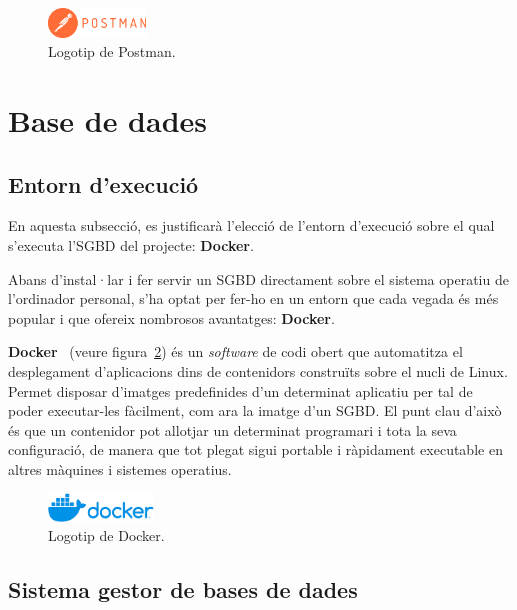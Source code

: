 \documentclass[a4paper,12pt]{ThesisStyle}
\begin{document}
\begin{figure}[H]
  \centering
  \includegraphics[width=0.23\textwidth]{assets/logos/Postman.png}
  \caption{\label{img:logo_postman}Logotip de Postman.}
\end{figure}

\section{Base de dades}
\label{sec:decisions_bdd}

\subsection{Entorn d'execució}
\label{subsec:decisions_bdd_entorn}

En aquesta subsecció, es justificarà l'elecció de l'entorn d'execució sobre el qual s'executa l'SGBD del projecte: \textbf{Docker}.

Abans d'instal·lar i fer servir un SGBD directament sobre el sistema operatiu de l'ordinador personal, s'ha optat per fer-ho en un entorn que cada vegada és més popular i que ofereix nombrosos avantatges: \textbf{Docker}.

\textbf{Docker}~\cite{Docker} (veure figura~\ref{img:logo_docker}) és un \textit{software} de codi obert que automatitza el desplegament d'aplicacions dins de contenidors construïts sobre el nucli de Linux. Permet disposar d'imatges predefinides d'un determinat aplicatiu per tal de poder executar-les fàcilment, com ara la imatge d'un SGBD. El punt clau d'això és que un contenidor pot allotjar un determinat programari i tota la seva configuració, de manera que tot plegat sigui portable i ràpidament executable en altres màquines i sistemes operatius.

\begin{figure}[H]
  \centering
  \includegraphics[width=0.25\textwidth]{assets/logos/Docker.png}
  \caption{\label{img:logo_docker}Logotip de Docker.}
\end{figure}

\subsection{Sistema gestor de bases de dades}
\label{subsec:decisions_bdd_sgbd}
\end{document}
